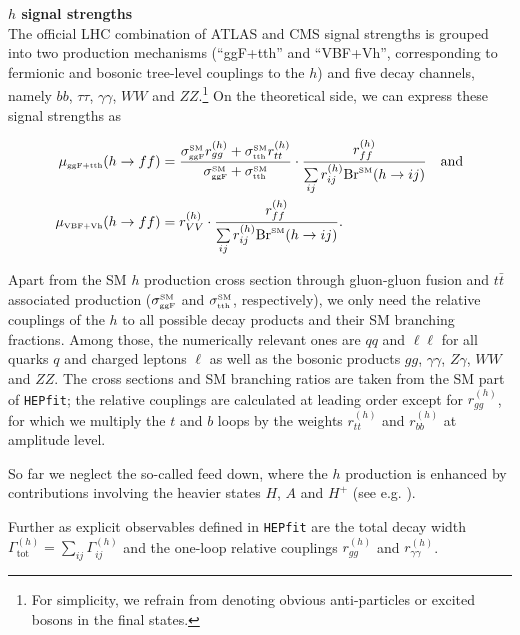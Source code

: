 \documentclass[aps,superscriptaddress,nofootinbib,floatfix,notitlepage]{revtex4-1}
\newcommand{\HEPfit}{\texttt{HEPfit}\xspace}
\begin{document}
\textbf{$h$ signal strengths}\\

The official LHC combination of ATLAS and CMS signal strengths is grouped into two production mechanisms (``ggF+tth'' and ``VBF+Vh'', corresponding to fermionic and bosonic tree-level couplings to the $h$) and five decay channels, namely $bb$, $\tau \tau$, $\gamma \gamma$, $WW$ and $ZZ$.\footnote{For simplicity, we refrain from denoting obvious anti-particles or excited bosons in the final states.}
On the theoretical side, we can express these signal strengths as

\begin{align}
 \mu_{\text{\tiny{ggF+tth}}}(h\to ff) &= \frac{\sigma^{\text{\tiny{SM}}}_{\text{\tiny{ggF}}} r_{gg}^{(h)} + \sigma^{\text{\tiny{SM}}}_{\text{\tiny{tth}}} r_{tt}^{(h)}}{\sigma^{\text{\tiny{SM}}}_{\text{\tiny{ggF}}} + \sigma^{\text{\tiny{SM}}}_{\text{\tiny{tth}}}} \cdot \frac{r_{ff}^{(h)}}{\sum\limits_{ij} r_{ij}^{(h)} {\rm Br}^{\text{\tiny{SM}}} (h\to ij)} \quad \text{and}  \nonumber\\
 \mu_{\text{\tiny{VBF+Vh}}}(h\to ff) &= r_{VV}^{(h)} \cdot \frac{r_{ff}^{(h)}}{\sum\limits_{ij} r_{ij}^{(h)} {\rm Br}^{\text{\tiny{SM}}} (h\to ij)}. \nonumber
\end{align}

Apart from the SM $h$ production cross section through gluon-gluon fusion and $t\bar{t}$ associated production ($\sigma^{\text{\tiny{SM}}}_{\text{\tiny{ggF}}}$ and $\sigma^{\text{\tiny{SM}}}_{\text{\tiny{tth}}}$, respectively), we only need the relative couplings of the $h$ to all possible decay products and their SM branching fractions.
Among those, the numerically relevant ones are $qq$ and $\ell \ell$ for all quarks $q$ and charged leptons $\ell$ as well as the bosonic products $gg$, $\gamma \gamma$, $Z \gamma$, $WW$ and $ZZ$. The cross sections and SM branching ratios are taken from the SM part of \HEPfit; the relative couplings are calculated at leading order except for $r_{gg}^{(h)}$, for which we multiply the $t$ and $b$ loops by the weights $r_{tt}^{(h)}$ and $r_{bb}^{(h)}$ at amplitude level.

So far we neglect the so-called feed down, where the $h$ production is enhanced by contributions involving the heavier states $H$, $A$ and $H^+$ (see e.g. \cite{Dumont:2014wha}).

Further as explicit observables defined in \HEPfit are the total decay width $\Gamma^{(h)}_{\text{tot}}=\sum_{ij}\Gamma_{ij}^{(h)}$ and the one-loop relative couplings $r_{gg}^{(h)}$ and $r_{\gamma \gamma}^{(h)}$.\\
\end{document}
